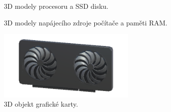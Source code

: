 \documentclass[12pt, a4paper,
twoside,        %
openright
]{report}
\begin{document}
\begin{figure}[H]
	\centering
	\qquad
	\caption{3D modely procesoru a SSD disku.}
	\label{fig:components}
\end{figure}

\begin{figure}[H]
	\centering
	\qquad
	\caption{3D modely napájecího zdroje počítače a paměti RAM.}
	\label{fig:components2}
\end{figure}

\begin{figure}[H]
	\centering 
	\includegraphics[width=0.6\textwidth]{image/gpu.png} 
	\caption{3D objekt grafické karty.} 
	\label{fig:components3} 
\end{figure}
\end{document}
